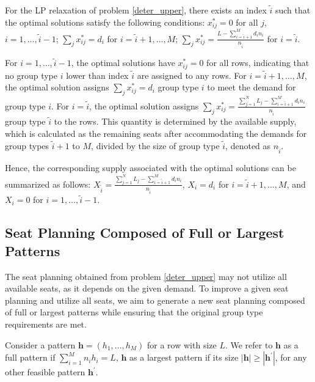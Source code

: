 
\begin{prop}\label{sol_relax_deter}
For the LP relaxation of problem \eqref{deter_upper}, there exists an index $\tilde{i}$ such that the optimal solutions satisfy the following conditions: $x_{ij}^{*} = 0$ for all $j$, $i = 1,\ldots, \tilde{i}-1$; $\sum_{j} x_{ij}^{*} = d_{i}$ for $i = \tilde{i}+1,\ldots, M$; $\sum_{j} x_{ij}^{*} = \frac{L - \sum_{i = \tilde{i}+1}^{M} {d_i n_i}}{n_{\tilde{i}}}$ for $i = \tilde{i}$.
\end{prop}

For $i = 1,\ldots, \tilde{i}-1$, the optimal solutions have $x_{ij}^{*} = 0$ for all rows, indicating that no group type $i$ lower than index $\tilde{i}$ are assigned to any rows. For $i = \tilde{i}+1,\ldots, M$, the optimal solution assigns $\sum_{j} x_{ij}^{*} = d_{i}$ group type $i$ to meet the demand for group type $i$. For $i = \tilde{i}$, the optimal solution assigns $\sum_{j} x_{ij}^{*} = \frac{\sum_{j=1}^{N}L_{j} - \sum_{i = \tilde{i}+1}^{M} {d_i n_i}}{n_{\tilde{i}}}$ group type $\tilde{i}$ to the rows. This quantity is determined by the available supply, which is calculated as the remaining seats after accommodating the demands for group types $\tilde{i}+1$ to $M$, divided by the size of group type $\tilde{i}$, denoted as $n_{\tilde{i}}$.

Hence, the corresponding supply associated with the optimal solutions can be summarized as follows: $X_{\tilde{i}} = \frac{\sum_{j=1}^{N}L_{j} - \sum_{i = \tilde{i}+1}^{M} {d_i n_i}}{n_{\tilde{i}}}$, $X_{i} = d_{i}$ for $i = \tilde{i} +1,\ldots, M$, and $X_{i} = 0$ for $i = 1, \ldots, \tilde{i}-1$.

\subsection{Seat Planning Composed of Full or Largest Patterns}
The seat planning obtained from problem \eqref{deter_upper} may not utilize all available seats, as it depends on the given demand. To improve a given seat planning and utilize all seats, we aim to generate a new seat planning composed of full or largest patterns while ensuring that the original group type requirements are met.

\begin{definition}
Consider a pattern $\bm{h} = (h_1, \ldots, h_M)$ for a row with size $L$. We refer to $\bm{h}$ as a full pattern if $\sum_{i=1}^{M} n_i h_i = L$, $\bm{h}$ as a largest pattern if its size $|\bm{h}| \geq |\bm{h}^{\prime}|$, for any other feasible pattern $\bm{h}^{\prime}$.
\end{definition}


